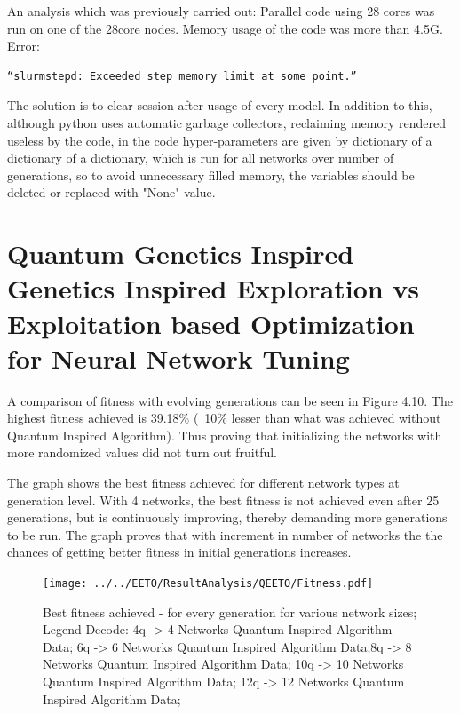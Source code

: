 An analysis which was previously carried out: Parallel code using 28 cores was run on one of the 28core nodes. Memory usage of the code was more than 4.5G. Error:

\begin{verbatim}
“slurmstepd: Exceeded step memory limit at some point.”
\end{verbatim}

The solution is to clear session after usage of every model. In addition to this, although python uses automatic garbage collectors, reclaiming memory rendered useless by the code, in the code hyper-parameters are given by dictionary of a dictionary of a dictionary, which is run for all networks over number of generations, so to avoid unnecessary filled memory, the variables should be deleted or replaced with "None" value. 




\clearpage

\section{Quantum Genetics Inspired Genetics Inspired Exploration vs Exploitation based Optimization for Neural Network Tuning}



A comparison of fitness with evolving generations can be seen in Figure 4.10. 
The highest fitness achieved is 39.18\% (~10\% lesser than what was achieved without Quantum Inspired Algorithm). Thus proving that initializing the networks with more randomized values did not turn out fruitful. 


The graph shows the best fitness achieved for different network types at generation level. With 4 networks, the best fitness is not achieved even after 25 generations, but is continuously improving, thereby demanding more generations to be run. The graph proves that with increment in number of networks the the chances of getting better fitness in initial generations increases.


\begin{figure}
	\texttt{[image: ../../EETO/ResultAnalysis/QEETO/Fitness.pdf]}
	\caption{Best fitness achieved - for every generation for various network sizes; \newline Legend Decode: \newline 4q -> 4 Networks Quantum Inspired Algorithm Data; \newline 6q -> 6 Networks Quantum Inspired Algorithm Data;\newline 8q -> 8 Networks Quantum Inspired Algorithm Data; \newline 10q -> 10 Networks Quantum Inspired Algorithm Data; \newline 12q -> 12 Networks Quantum Inspired Algorithm Data; }
\end{figure}


